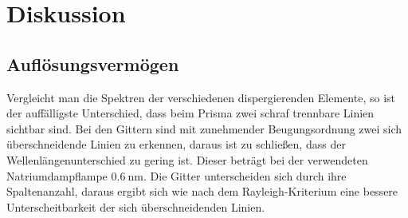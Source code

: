 \newpage
\section{Diskussion}
\subsection{Auflösungsvermögen}
Vergleicht man die Spektren der verschiedenen dispergierenden Elemente, so ist der auffälligste Unterschied, dass beim Prisma zwei schraf trennbare Linien sichtbar sind. Bei den Gittern sind mit zunehmender Beugungsordnung zwei sich überschneidende Linien zu erkennen, daraus ist zu schließen, dass der Wellenlängenunterschied zu gering ist.
Dieser beträgt bei der verwendeten Natriumdampflampe $ \SI{0,6}{\nano\meter} $. Die Gitter unterscheiden sich durch ihre Spaltenanzahl, daraus ergibt sich wie nach dem Rayleigh-Kriterium eine bessere Unterscheitbarkeit der sich überschneidenden Linien. 
